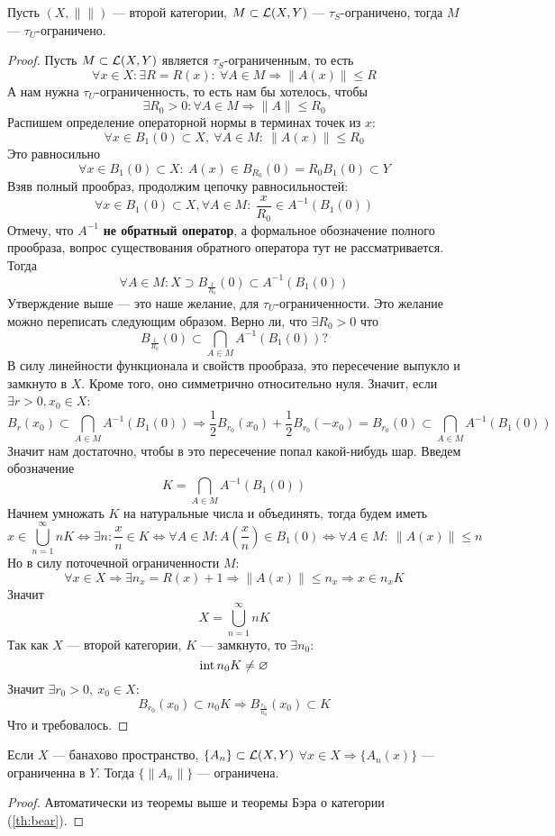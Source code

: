 \begin{theorem}\label{th:banach-sht}
	Пусть $(X, \|\|)$ --- второй категории, $M \subset \mathcal{L}(X,Y)$ --- $\tau_S$-ограничено, тогда $M$ --- $\tau_U$-ограничено.
\end{theorem}
\begin{proof}
	 Пусть $M \subset \mathcal{L}(X, Y)$ является $\tau_S$-ограниченным, то есть 
	$$
	\forall x \in X: \exists R = R(x): \ \forall A \in M \Rightarrow \|A(x)\| \leq R
	$$
	А нам нужна $\tau_U$-ограниченность, то есть нам бы хотелось, чтобы
	$$
	\exists R_0 > 0: \forall 
	A \in M \Rightarrow \|A\| \leq R_0
	$$
	Распишем определение операторной нормы в терминах точек из $x$: 
	$$
	\forall x \in B_1(0) \subset X, \ \forall 
	A \in M: \ \|A(x)\| \leq R_0
	$$
	Это равносильно
	$$
	\forall x \in B_1(0) \subset X: \ A(x) \in B_{R_0}(0) = R_0B_1(0) \subset Y
	$$
	Взяв полный прообраз, продолжим цепочку равносильностей:
	$$
	\forall x \in B_1(0) \subset X, \forall A \in M : \ \frac{x}{R_0} \in A^{-1}(B_1(0))
	$$
	Отмечу, что $A^{-1}$ \textbf{не обратный оператор}, а формальное обозначение полного прообраза, вопрос существования обратного оператора тут не рассматривается. Тогда 
	$$
	\forall A \in M: X \supset B_{\frac{1}{R_0}}(0) \subset A^{-1}(B_1(0))
	$$
	Утверждение выше --- это наше желание, для $\tau_U$-ограниченности. Это желание можно переписать следующим образом. Верно ли, что $\exists R_0 > 0$ что
	$$
	B_{\frac{1}{R_0}}(0) \subset \bigcap_{A \in M}A^{-1}(B_1(0))?
	$$
	В силу линейности функционала и свойств прообраза, это пересечение выпукло и замкнуто в $X$. Кроме того, оно симметрично относительно нуля. Значит, если $\exists r > 0, x_0 \in X$:
	$$
	B_r(x_0) \subset \bigcap_{A \in M}A^{-1}(B_1(0)) \Rightarrow  \frac{1}{2}B_{r_0}(x_0) + \frac{1}{2}B_{r_0}(-x_0) = B_{r_0}(0)  \subset \bigcap_{A \in M}A^{-1}(B_1(0))
	$$
	Значит нам достаточно, чтобы в это пересечение попал какой-нибудь шар.
	Введем обозначение
	$$
	K = \bigcap_{A \in M}A^{-1}(B_1(0))
	$$ 
	Начнем умножать $K$ на натуральные числа и объединять, тогда будем иметь
	$$
	x \in \bigcup_{n=1}^\infty nK \Leftrightarrow \exists n : \frac{x}{n} \in K \Leftrightarrow \forall A \in M:  A\left(\frac{x}{n}\right) \in B_1(0) \Leftrightarrow \forall A \in M : \ \|A(x)\| \leq n
	$$
	Но в силу поточечной ограниченности $M$: 
	$$
	\forall x \in X \Rightarrow \exists n_x = R(x) + 1 \Rightarrow \|A(x)\| \leq n_x \Rightarrow x \in n_x K
	$$
	Значит
	$$
	X = \bigcup_{n=1}^\infty nK
	$$
	Так как $X$ --- второй категории, $K$ --- замкнуто, то $\exists n_0$:
	$$
	\operatorname{int} n_0K \neq \varnothing
	$$
	Значит $\exists r_0>0, \ x_0 \in X$:
	$$
	B_{r_0}(x_0) \subset n_0 K \Rightarrow B_{\frac{r_0}{n_0}}(x_0) \subset K
	$$
	Что и требовалось.
\end{proof}
\begin{next1}
	Если $X$ --- банахово пространство, $\{A_n\} \subset \mathcal{L}(X, Y)$ $\forall x \in X \Rightarrow \{A_n(x)\}$ --- ограниченна в $Y$. Тогда $\{\|A_n\|\}$ --- ограничена.
\end{next1}
\begin{proof}
	Автоматически из теоремы выше и теоремы Бэра о категории (\ref{th:bear}).
\end{proof}

